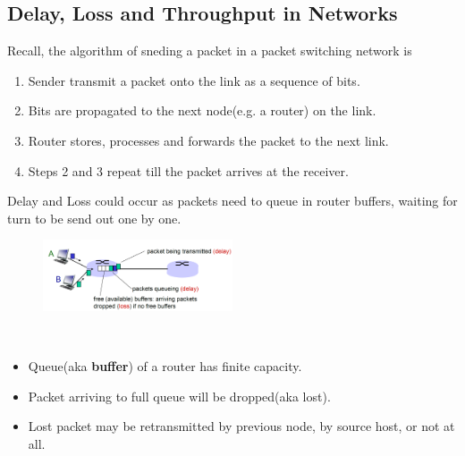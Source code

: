 \documentclass[12pt]{article}
\theoremstyle{definition}
\begin{document}
\subsection{Delay, Loss and Throughput in Networks}
Recall, the algorithm of sneding a packet in a packet switching network is
\begin{enumerate}
  \item Sender transmit a packet onto the link as a sequence of bits.
  \item Bits are propagated to the next node(e.g. a router) on the link.
  \item Router stores, processes and forwards the packet to the next link.
  \item Steps 2 and 3 repeat till the packet arrives at the receiver.
\end{enumerate}
Delay and Loss could occur as packets need to queue in router buffers, waiting for turn to be send out one by one.
\begin{figure}[h]
\centering
\includegraphics[width = 0.5\textwidth]{1_4_1.png}
\end{figure}\\
\begin{itemize}
  \item Queue(aka \textbf{buffer}) of a router has finite capacity.
  \item Packet arriving to full queue will be dropped(aka lost).
  \item Lost packet may be retransmitted by previous node, by source host, or not at all.
\end{itemize}
\end{document}
